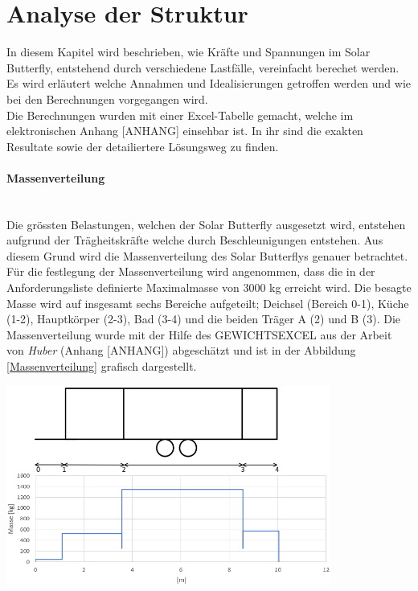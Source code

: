 \section{Analyse der Struktur}
In diesem Kapitel wird beschrieben, wie Kräfte und Spannungen im Solar Butterfly, entstehend durch verschiedene Lastfälle, vereinfacht berechet werden. Es wird erläutert welche Annahmen und Idealisierungen getroffen werden und wie bei den Berechnungen vorgegangen wird.\\
Die Berechnungen wurden mit einer Excel-Tabelle gemacht, welche im elektronischen Anhang [ANHANG] einsehbar ist. In ihr sind die exakten Resultate sowie der detailiertere Lösungsweg zu finden.

\paragraph{Massenverteilung}\mbox{}\\
Die grössten Belastungen, welchen der Solar Butterfly ausgesetzt wird, entstehen aufgrund der Trägheitskräfte welche durch Beschleunigungen entstehen. Aus diesem Grund wird die Massenverteilung des Solar Butterflys genauer betrachtet. Für die festlegung der Massenverteilung wird angenommen, dass die in der Anforderungsliste definierte Maximalmasse von 3000 kg erreicht wird. Die besagte Masse wird auf insgesamt sechs Bereiche aufgeteilt; Deichsel (Bereich 0-1), Küche (1-2), Hauptkörper (2-3), Bad (3-4) und die beiden Träger A (2) und B (3). Die Massenverteilung wurde mit der Hilfe des GEWICHTSEXCEL aus der Arbeit von \emph{Huber} (Anhang [ANHANG]) abgeschätzt und ist in der Abbildung \ref{Massenverteilung} grafisch dargestellt.

\begin{center}
  \includegraphics[width=0.8\textwidth]{04_Figures/Massenverteilung.png}
  \label{Massenverteilung}
\end{center}


